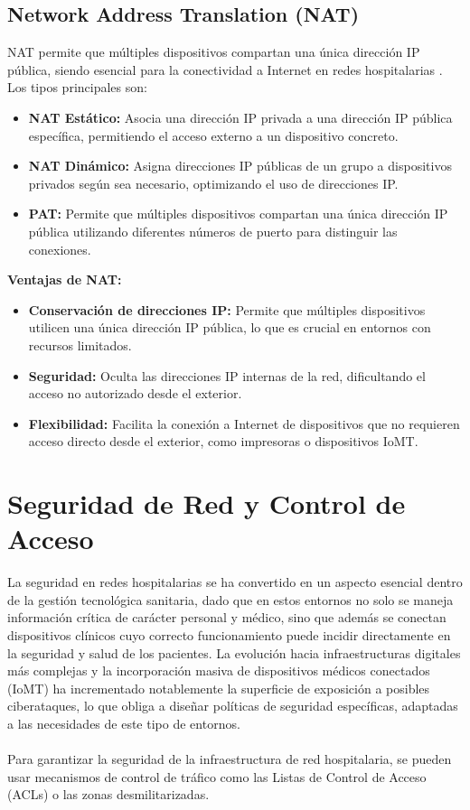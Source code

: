 \subsection{Network Address Translation (NAT)}
\label{subsec:nat}
NAT permite que múltiples dispositivos compartan una única dirección IP pública, siendo esencial para la conectividad a Internet en redes hospitalarias \cite{cisco-hospital-design}. Los tipos principales son:
\begin{itemize}
    \item \textbf{NAT Estático:} Asocia una dirección IP privada a una dirección IP pública específica, permitiendo el acceso externo a un dispositivo concreto.
    \item \textbf{NAT Dinámico:} Asigna direcciones IP públicas de un grupo a dispositivos privados según sea necesario, optimizando el uso de direcciones IP.
    \item \textbf{\ac{PAT}:} Permite que múltiples dispositivos compartan una única dirección IP pública utilizando diferentes números de puerto para distinguir las conexiones.
\end{itemize}

\textbf{Ventajas de NAT:}
\begin{itemize}
    \item \textbf{Conservación de direcciones IP:} Permite que múltiples dispositivos utilicen una única dirección IP pública, lo que es crucial en entornos con recursos limitados.
    \item \textbf{Seguridad:} Oculta las direcciones IP internas de la red, dificultando el acceso no autorizado desde el exterior.
    \item \textbf{Flexibilidad:} Facilita la conexión a Internet de dispositivos que no requieren acceso directo desde el exterior, como impresoras o dispositivos IoMT.
\end{itemize}

\section{Seguridad de Red y Control de Acceso}
La seguridad en redes hospitalarias se ha convertido en un aspecto esencial dentro de la gestión tecnológica sanitaria, dado que en estos entornos no solo se maneja información 
crítica de carácter personal y médico, sino que además se conectan dispositivos clínicos cuyo correcto funcionamiento puede incidir directamente en la seguridad y salud de 
los pacientes. La evolución hacia infraestructuras digitales más complejas y la incorporación masiva de dispositivos médicos conectados (IoMT) ha incrementado notablemente 
la superficie de exposición a posibles ciberataques, lo que obliga a diseñar políticas de seguridad específicas, adaptadas a las necesidades de este tipo de entornos.
\\ \\
Para garantizar la seguridad de la infraestructura de red hospitalaria, se pueden usar mecanismos de control de tráfico como las Listas de Control de Acceso (ACLs) o las zonas desmilitarizadas. 


